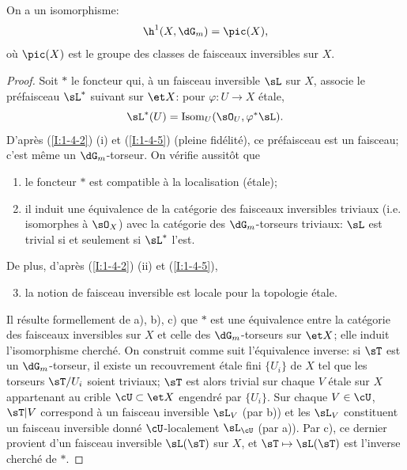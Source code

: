 \begin{propositiondash}\label{I:2-2-3}
On a un isomorphisme:
\[
  \h^1(X,\dG_m) = \pic(X)\text{,}
\]
où $\pic(X)$ est le groupe des classes de faisceaux inversibles sur $X$.
\end{propositiondash}
\begin{proof}
Soit $*$ le foncteur qui, à un faisceau inversible $\sL$ sur $X$, associe le 
préfaisceau $\sL^*$ suivant sur $\et X$: pour $\varphi:U\to X$ étale, 
\[
  \sL^*(U)=\operatorname{Isom}_U(\sO_U,\varphi^*\sL)\text{.}
\]
D'après (\ref{I:1-4-2}) (i) et (\ref{I:1-4-5}) (pleine fidélité), ce 
préfaisceau est un faisceau; c'est même un $\dG_m$-torseur. On vérifie 
aussitôt que 
\begin{enumerate}[\indent a)]
  \item le foncteur $*$ est compatible à la localisation (étale);
  \item il induit une équivalence de la catégorie des faisceaux 
    inversibles triviaux (i.e. isomorphes à $\sO_X$) avec la catégorie des 
    $\dG_m$-torseurs triviaux: $\sL$ est trivial si et seulement si $\sL^*$ 
    l'est.
\end{enumerate}

De plus, d'après (\ref{I:1-4-2}) (ii) et (\ref{I:1-4-5}), 
\begin{enumerate}[\indent a)]
\setcounter{enumi}{2}
  \item {}la notion de faisceau inversible est locale pour la topologie étale. 
\end{enumerate}

Il résulte formellement de a), b), c) que $*$ est une équivalence entre la 
catégorie des faisceaux inversibles sur $X$ et celle des $\dG_m$-torseurs 
sur $\et X$; elle induit l'isomorphisme cherché. On construit comme suit 
l'équivalence inverse: si $\sT$ est un $\dG_m$-torseur, il existe un 
recouvrement étale fini $\{U_i\}$ de $X$ tel que les torseurs $\sT/U_i$ soient 
triviaux; $\sT$ est alors trivial sur chaque $V$ étale sur $X$ appartenant au 
crible $\cU\subset \et X$ engendré par $\{U_i\}$. Sur chaque 
$V\in\cU$, $\sT|V$ correspond à un faisceau inversible $\sL_V$ (par b)) et les 
$\sL_V$ constituent un faisceau inversible donné $\cU$-localement $\sL_\cU$ 
(par a)). Par c), ce dernier provient d'un faisceau inversible $\sL(\sT)$ sur 
$X$, et $\sT\mapsto \sL(\sT)$ est l'inverse cherché de $*$. 
\end{proof}






